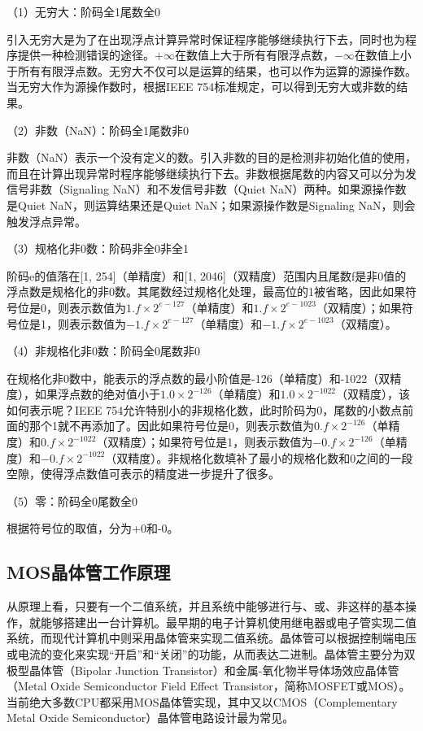 \documentclass[]{ctexbook}
\begin{document}
（1）无穷大：阶码全1尾数全0

引入无穷大是为了在出现浮点计算异常时保证程序能够继续执行下去，同时也为程序提供一种检测错误的途径。\(+\infty\)在数值上大于所有有限浮点数，\(-\infty\)在数值上小于所有有限浮点数。无穷大不仅可以是运算的结果，也可以作为运算的源操作数。当无穷大作为源操作数时，根据IEEE 754标准规定，可以得到无穷大或非数的结果。

（2）非数（NaN）：阶码全1尾数非0

非数（NaN）表示一个没有定义的数。引入非数的目的是检测非初始化值的使用，而且在计算出现异常时程序能够继续执行下去。非数根据尾数的内容又可以分为发信号非数（Signaling NaN）和不发信号非数（Quiet NaN）两种。如果源操作数是Quiet NaN，则运算结果还是Quiet NaN；如果源操作数是Signaling NaN，则会触发浮点异常。

（3）规格化非0数：阶码非全0非全1

阶码e的值落在{[}1, 254{]}（单精度）和{[}1, 2046{]}（双精度）范围内且尾数f是非0值的浮点数是规格化的非0数。其尾数经过规格化处理，最高位的1被省略，因此如果符号位是0，则表示数值为\(1.f\times 2^{e-127}\)（单精度）和\(1.f\times 2^{e-1023}\)（双精度）；如果符号位是1，则表示数值为\(-1.f\times 2^{e-127}\)（单精度）和\(-1.f\times 2^{e-1023}\)（双精度）。

（4）非规格化非0数：阶码全0尾数非0

在规格化非0数中，能表示的浮点数的最小阶值是-126（单精度）和-1022（双精度），如果浮点数的绝对值小于\(1.0\times 2^{-126}\)（单精度）和\(1.0\times 2^{-1022}\)（双精度），该如何表示呢？IEEE 754允许特别小的非规格化数，此时阶码为0，尾数的小数点前面的那个1就不再添加了。因此如果符号位是0，则表示数值为\(0.f\times 2^{-126}\)（单精度）和\(0.f\times 2^{-1022}\)（双精度）；如果符号位是1，则表示数值为\(-0.f\times 2^{-126}\)（单精度）和\(-0.f\times 2^{-1022}\)（双精度）。非规格化数填补了最小的规格化数和0之间的一段空隙，使得浮点数值可表示的精度进一步提升了很多。

（5）零：阶码全0尾数全0

根据符号位的取值，分为+0和-0。

\hypertarget{sec-MOS-principle}{%
\subsection{MOS晶体管工作原理}\label{sec-MOS-principle}}

从原理上看，只要有一个二值系统，并且系统中能够进行与、或、非这样的基本操作，就能够搭建出一台计算机。最早期的电子计算机使用继电器或电子管实现二值系统，而现代计算机中则采用晶体管来实现二值系统。晶体管可以根据控制端电压或电流的变化来实现``开启''和``关闭''的功能，从而表达二进制。晶体管主要分为双极型晶体管（Bipolar Junction Transistor）和金属-氧化物半导体场效应晶体管（Metal Oxide Semiconductor Field Effect Transistor，简称MOSFET或MOS）。当前绝大多数CPU都采用MOS晶体管实现，其中又以CMOS（Complementary Metal Oxide Semiconductor）晶体管电路设计最为常见。
\end{document}
